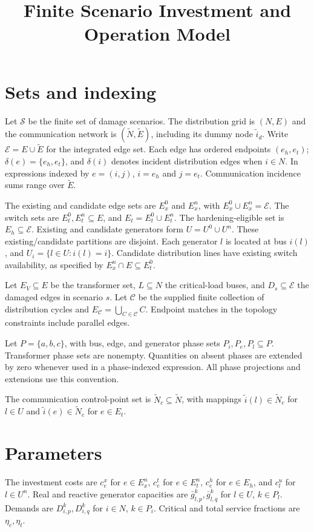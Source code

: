 \documentclass[11pt]{article}
\title{Finite Scenario Investment and Operation Model}
\author{}
\date{}
\begin{document}
\maketitle

\section{Sets and indexing}
Let $\mathcal S$ be the finite set of damage scenarios. The distribution grid is $(N,E)$ and the communication network is $(\widetilde N,\widetilde E)$, including its dummy node $\widetilde i_d$. Write $\mathcal E=E\cup\widetilde E$ for the integrated edge set. Each edge has ordered endpoints $(e_h,e_t)$; $\delta(e)=\{e_h,e_t\}$, and $\delta(i)$ denotes incident distribution edges when $i\in N$. In expressions indexed by $e=(i,j)$, $i=e_h$ and $j=e_t$. Communication incidence sums range over $\widetilde E$.

The existing and candidate edge sets are $E_x^0$ and $E_x^n$, with $E_x^0\cup E_x^n=\mathcal E$. The switch sets are $E_t^0,E_t^n\subseteq E$, and $E_t=E_t^0\cup E_t^n$. The hardening-eligible set is $E_h\subseteq\mathcal E$. Existing and candidate generators form $U=U^0\cup U^n$. These existing/candidate partitions are disjoint. Each generator $l$ is located at bus $i(l)$, and $U_i=\{l\in U:i(l)=i\}$. Candidate distribution lines have existing switch availability, as specified by $E_x^n\cap E\subseteq E_t^0$.

Let $E_V\subseteq E$ be the transformer set, $L\subseteq N$ the critical-load buses, and $D_s\subseteq\mathcal E$ the damaged edges in scenario $s$. Let $\mathcal C$ be the supplied finite collection of distribution cycles and $E_{\mathcal C}=\bigcup_{C\in\mathcal C}C$. Endpoint matches in the topology constraints include parallel edges.

Let $P=\{a,b,c\}$, with bus, edge, and generator phase sets $P_i,P_e,P_l\subseteq P$. Transformer phase sets are nonempty. Quantities on absent phases are extended by zero whenever used in a phase-indexed expression. All phase projections and extensions use this convention.

The communication control-point set is $\widetilde N_c\subseteq\widetilde N$, with mappings $\widetilde i(l)\in\widetilde N_c$ for $l\in U$ and $\widetilde i(e)\in\widetilde N_c$ for $e\in E_t$.

\section{Parameters}
The investment costs are $c_e^x$ for $e\in E_x^n$, $c_e^t$ for $e\in E_t^n$, $c_e^h$ for $e\in E_h$, and $c_l^u$ for $l\in U^n$. Real and reactive generator capacities are $\bar g_{l,p}^k,\bar g_{l,q}^k$ for $l\in U$, $k\in P_l$. Demands are $D_{i,p}^k,D_{i,q}^k$ for $i\in N$, $k\in P_i$. Critical and total service fractions are $\eta_c,\eta_t$.
\end{document}
